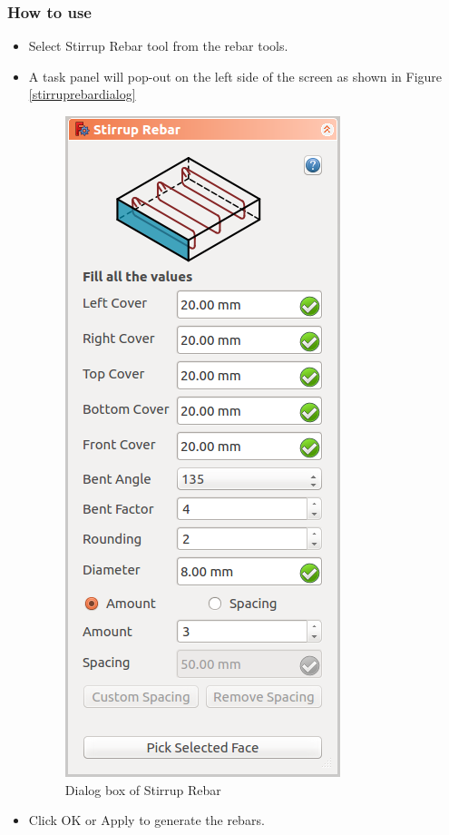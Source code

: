 \subsubsection{How to use}
\begin{itemize}
\item Select Stirrup Rebar tool from the rebar tools.
\item A task panel will pop-out on the left side of the screen as shown in Figure \ref{stirruprebardialog}
\begin{figure}
    \centering \includegraphics[scale=0.60]{images/StirrupDialog.png}
    \caption{Dialog box of Stirrup Rebar}
    \label{stirrupshaperebardialog}
\end{figure}
\item Click OK or Apply to generate the rebars.
\end{itemize}

